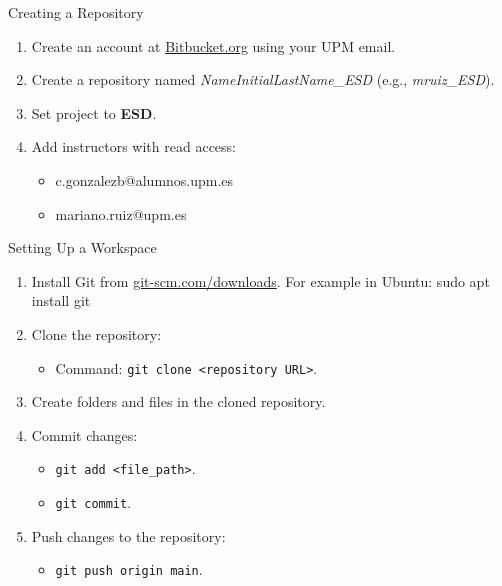 \begin{frame}{Creating a Repository}
  \begin{enumerate}
    \item Create an account at \href{https://bitbucket.org}{Bitbucket.org} using your UPM email.
    \item Create a repository named \textit{NameInitialLastName\_ESD} (e.g., \textit{mruiz\_ESD}).
    \item Set project to \textbf{ESD}.
    \item Add instructors with read access:
    \begin{itemize}
      \item c.gonzalezb@alumnos.upm.es
      \item mariano.ruiz@upm.es
    \end{itemize}
  \end{enumerate}
\end{frame}


\begin{frame}{Setting Up a Workspace}
  \begin{enumerate}
    \item Install Git from \href{https://git-scm.com/downloads}{git-scm.com/downloads}. For example in Ubuntu: sudo apt install git
    \item Clone the repository:
    \begin{itemize}
      \item Command: \texttt{git clone <repository URL>}.
    \end{itemize}
    \item Create folders and files in the cloned repository.
    \item Commit changes:
    \begin{itemize}
      \item \texttt{git add <file\_path>}.
      \item \texttt{git commit}.
    \end{itemize}
    \item Push changes to the repository:
    \begin{itemize}
      \item \texttt{git push origin main}.
    \end{itemize}
  \end{enumerate}
\end{frame}


